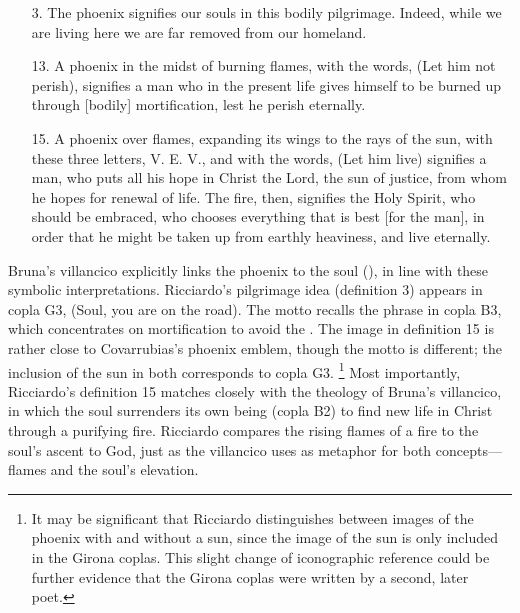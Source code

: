 \begin{quoting}
\begin{enumerate}
\item[3.]
	The phoenix signifies our souls in this bodily pilgrimage.
	Indeed, while we are living here we are far removed from our homeland.
\item[13.]
	A phoenix in the midst of burning flames, with the words,  (Let him not perish), signifies a man who in the present life gives himself to be burned up through [bodily] mortification, lest he perish eternally.
\item[15.]
	A phoenix over flames, expanding its wings to the rays of the sun, with these three letters, V. E. V., and with the words,  (Let him live) \Dots{} signifies a man, who puts all his hope in Christ the Lord, the sun of justice, from whom he hopes for renewal of life. 
The fire, then, signifies the Holy Spirit, who should be embraced, who chooses everything that is best [for the man], in order that he might be taken up from earthly heaviness, and live eternally.%
		\Autocite[, 132--133]{Ricciardo:CommentariaSymbolica}
\end{enumerate}
\end{quoting}

Bruna's villancico explicitly links the phoenix to the soul (), in line with these symbolic interpretations.
Ricciardo's pilgrimage idea (definition 3) appears in copla G3,  (Soul, you are on the road).
The motto  recalls the phrase  in copla B3, which concentrates on mortification to avoid the .
The image in definition 15 is rather close to Covarrubias's phoenix emblem, though the motto is different; the inclusion of the sun in both corresponds to copla G3.%
	\footnote{%
	It may be significant that Ricciardo distinguishes between images of the phoenix with and without a sun, since the image of the sun is only included in the Girona coplas.
	This slight change of iconographic reference could be further evidence that the Girona coplas were written by a second, later poet.
	}
Most importantly, Ricciardo's definition 15 matches closely with the theology of Bruna's villancico, in which the soul surrenders its own being (copla B2) to find new life in Christ through a purifying fire. 
Ricciardo compares the rising flames of a fire to the soul's ascent to God, just as the villancico uses  as metaphor for both concepts---flames and the soul's elevation.

